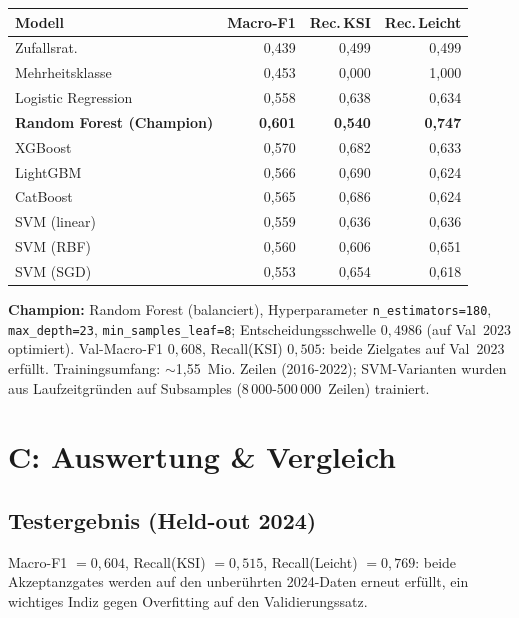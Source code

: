 \documentclass[11pt,a4paper]{article}
\newcommand{\code}[1]{\texttt{\small #1}}
\begin{document}
\begin{center}
\small
\begin{tabularx}{\linewidth}{Yrrr}
\toprule
\textbf{Modell} & \textbf{Macro-F1} & \textbf{Rec.\,KSI} & \textbf{Rec.\,Leicht} \\
\midrule
Zufallsrat. & 0{,}439 & 0{,}499 & 0{,}499 \\
Mehrheitsklasse & 0{,}453 & 0{,}000 & 1{,}000 \\
Logistic Regression & 0{,}558 & 0{,}638 & 0{,}634 \\
\textbf{Random Forest (Champion)} & \textbf{0{,}601} & \textbf{0{,}540} & \textbf{0{,}747} \\
XGBoost & 0{,}570 & 0{,}682 & 0{,}633 \\
LightGBM & 0{,}566 & 0{,}690 & 0{,}624 \\
CatBoost & 0{,}565 & 0{,}686 & 0{,}624 \\
SVM (linear) & 0{,}559 & 0{,}636 & 0{,}636 \\
SVM (RBF) & 0{,}560 & 0{,}606 & 0{,}651 \\
SVM (SGD) & 0{,}553 & 0{,}654 & 0{,}618 \\
\bottomrule
\end{tabularx}
\end{center}

\textbf{Champion:} Random Forest (balanciert), Hyperparameter
\code{n\_estimators=180}, \code{max\_depth=23},
\code{min\_samples\_leaf=8}; Entscheidungsschwelle $0{,}4986$
(auf Val~2023 optimiert). Val-Macro-F1 $0{,}608$, Recall(KSI)
$0{,}505$: beide Zielgates auf Val~2023 erfüllt. Trainingsumfang:
$\sim$1{,}55~Mio. Zeilen (2016-2022); SVM-Varianten wurden aus
Laufzeitgründen auf Subsamples (8\,000-500\,000~Zeilen) trainiert.


\section{C: Auswertung \& Vergleich}
\subsection*{Testergebnis (Held-out 2024)}
Macro-F1 $= 0{,}604$, Recall(KSI) $= 0{,}515$, Recall(Leicht)
$= 0{,}769$: beide Akzeptanzgates werden auf den unberührten
2024-Daten erneut erfüllt, ein wichtiges Indiz gegen Overfitting auf
den Validierungssatz.
\end{document}
